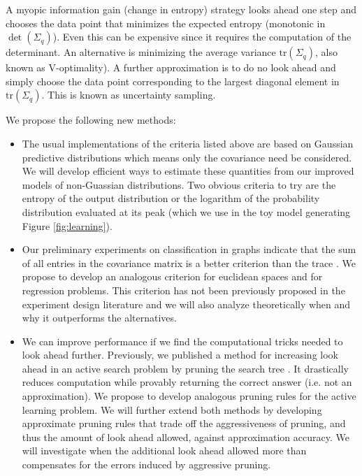 \documentclass[prd,nofootbib,floatfix,11pt,tightenlines]{revtex4}
\begin{document}
A myopic information gain (change in entropy) strategy looks ahead one step
and chooses the data point that minimizes the expected entropy (monotonic
in $\det(\Sigma_q)$).  Even this can be expensive since it requires the
computation of the determinant.  An alternative is minimizing the average
variance $\text{tr}(\Sigma_q)$, also known as V-optimality).  A further
approximation is to do no look ahead and simply choose the data point
corresponding to the largest diagonal element in $\text{tr}(\Sigma_q)$.  This is
known as uncertainty sampling.

We propose the following new methods:

\vspace{.5\baselineskip}
\begin{itemize}

\item The usual implementations of the criteria listed above are based on
  Gaussian predictive distributions which means only the covariance need be
  considered.  We will develop efficient ways to estimate these quantities
  from our improved models of non-Guassian distributions.  Two obvious criteria to try
  are the entropy of the output distribution or the logarithm of the probability
  distribution evaluated at its peak (which we use in the toy model
  generating Figure \ref{fig:learning}).

\item Our preliminary experiments on classification in graphs indicate that
  the sum of all entries in the covariance matrix is a better criterion
  than the trace \cite{YifeiMa12}.  We propose to develop an analogous
  criterion for euclidean spaces and for regression problems.  This
  criterion has not been previously proposed in the experiment design
  literature and we will also analyze theoretically when and why it
  outperforms the alternatives.

\item We can improve performance if we find the computational tricks needed
  to look ahead further.  Previously, we published a method for increasing
  look ahead in an active search problem by pruning the search tree
  \citet{Garnett12}.  It drastically reduces computation while provably
  returning the correct answer (i.e. not an approximation).  We propose to
  develop analogous pruning rules for the active learning problem.  We will
  further extend both methods by developing approximate pruning rules that
  trade off the aggressiveness of pruning, and thus the amount of look
  ahead allowed, against approximation accuracy.  We will investigate when
  the additional look ahead allowed more than compensates for the errors
  induced by aggressive pruning.

\end{itemize}
\vspace{.5\baselineskip}
\end{document}
